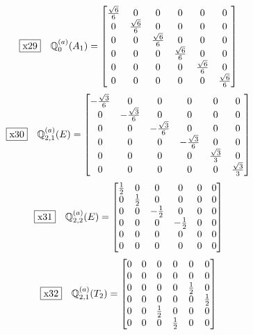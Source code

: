 \documentclass[fleqn,10pt,landscape]{jsarticle}
\begin{document}
\begin{dmath*}
\fbox{x29}\quad \mathbb{Q}_{0}^{(a)}(A_{1})=\begin{bmatrix} \frac{\sqrt{6}}{6} & 0 & 0 & 0 & 0 & 0 \\ 0 & \frac{\sqrt{6}}{6} & 0 & 0 & 0 & 0 \\ 0 & 0 & \frac{\sqrt{6}}{6} & 0 & 0 & 0 \\ 0 & 0 & 0 & \frac{\sqrt{6}}{6} & 0 & 0 \\ 0 & 0 & 0 & 0 & \frac{\sqrt{6}}{6} & 0 \\ 0 & 0 & 0 & 0 & 0 & \frac{\sqrt{6}}{6} \end{bmatrix}
\end{dmath*}
\begin{dmath*}
\fbox{x30}\quad \mathbb{Q}_{2,1}^{(a)}(E)=\begin{bmatrix} - \frac{\sqrt{3}}{6} & 0 & 0 & 0 & 0 & 0 \\ 0 & - \frac{\sqrt{3}}{6} & 0 & 0 & 0 & 0 \\ 0 & 0 & - \frac{\sqrt{3}}{6} & 0 & 0 & 0 \\ 0 & 0 & 0 & - \frac{\sqrt{3}}{6} & 0 & 0 \\ 0 & 0 & 0 & 0 & \frac{\sqrt{3}}{3} & 0 \\ 0 & 0 & 0 & 0 & 0 & \frac{\sqrt{3}}{3} \end{bmatrix}
\end{dmath*}
\begin{dmath*}
\fbox{x31}\quad \mathbb{Q}_{2,2}^{(a)}(E)=\begin{bmatrix} \frac{1}{2} & 0 & 0 & 0 & 0 & 0 \\ 0 & \frac{1}{2} & 0 & 0 & 0 & 0 \\ 0 & 0 & - \frac{1}{2} & 0 & 0 & 0 \\ 0 & 0 & 0 & - \frac{1}{2} & 0 & 0 \\ 0 & 0 & 0 & 0 & 0 & 0 \\ 0 & 0 & 0 & 0 & 0 & 0 \end{bmatrix}
\end{dmath*}
\begin{dmath*}
\fbox{x32}\quad \mathbb{Q}_{2,1}^{(a)}(T_{2})=\begin{bmatrix} 0 & 0 & 0 & 0 & 0 & 0 \\ 0 & 0 & 0 & 0 & 0 & 0 \\ 0 & 0 & 0 & 0 & \frac{1}{2} & 0 \\ 0 & 0 & 0 & 0 & 0 & \frac{1}{2} \\ 0 & 0 & \frac{1}{2} & 0 & 0 & 0 \\ 0 & 0 & 0 & \frac{1}{2} & 0 & 0 \end{bmatrix}
\end{dmath*}
\end{document}
